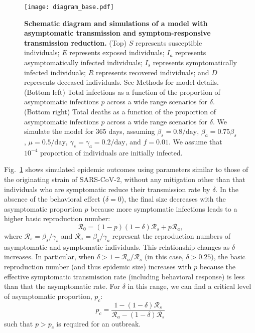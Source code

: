 \documentclass[12pt]{article}
\newcommand{\fref}[1]{Fig.~\ref{fig:#1}}
\newcommand{\RR}{\ensuremath{{\mathcal R}}\xspace}
\begin{document}
\begin{figure}[!ht]
\texttt{[image: diagram\_base.pdf]}
\caption{
\textbf{Schematic diagram and simulations of a model with asymptomatic transmission and symptom-responsive transmission reduction.}
(Top) $S$ represents susceptible individuals; $E$ represents exposed individuals; $I_a$ represents asymptomatically infected individuals; $I_s$ represents symptomatically infected individuals; $R$ represents recovered individuals; and $D$ represents deceased individuals. See Methods for model details.
(Bottom left) Total infections as a function of the proportion of asymptomatic infections $p$ across a wide range scenarios for $\delta$.
(Bottom right) Total deaths as a function of the proportion of asymptomatic infections $p$ across a wide range scenarios for $\delta$.
We simulate the model for 365 days, assuming $\beta_s = 0.8/\mathrm{day}$, $\beta_a = 0.75 \beta_s$, $\mu=0.5/\mathrm{day}$, $\gamma_s=\gamma_a=0.2/\mathrm{day}$, and $f=0.01$.
We assume that $10^{-4}$ proportion of individuals are initially infected.
}
\label{fig:base}
\end{figure}

\fref{base} shows simulated epidemic outcomes using parameters similar to those of the originating strain of SARS-CoV-2, without any mitigation other than that individuals who are symptomatic reduce their transmission rate by $\delta$. 
In the absence of the behavioral effect ($\delta=0$), the final size decreases with the asymptomatic proportion $p$ because more symptomatic infections leads to a higher basic reproduction number:
\begin{equation}
\RR_0 = (1-p) (1-\delta) \RR_s + p \RR_a,
\end{equation}
where $\RR_s = \beta_s/\gamma_s$ and $\RR_a = \beta_a/\gamma_a$ represent the reproduction numbers of asymptomatic and symptomatic individuals.
This relationship changes as $\delta$ increases.
In particular, when $\delta > 1-\RR_a/\RR_s$ (in this case, $\delta > 0.25)$, the basic reproduction number (and thus epidemic size) increases with $p$ because the effective symptomatic transmission rate (including behavioral response) is less than that the asymptomatic rate.
For $\delta$ in this range, we can find a critical level of asymptomatic proportion, $p_c$:
\begin{equation}
    p_c = \frac{1 - (1-\delta) \RR_s}{\RR_a - (1-\delta) \RR_s}
\end{equation}
such that $p>p_c$ is required for an outbreak.
\end{document}
